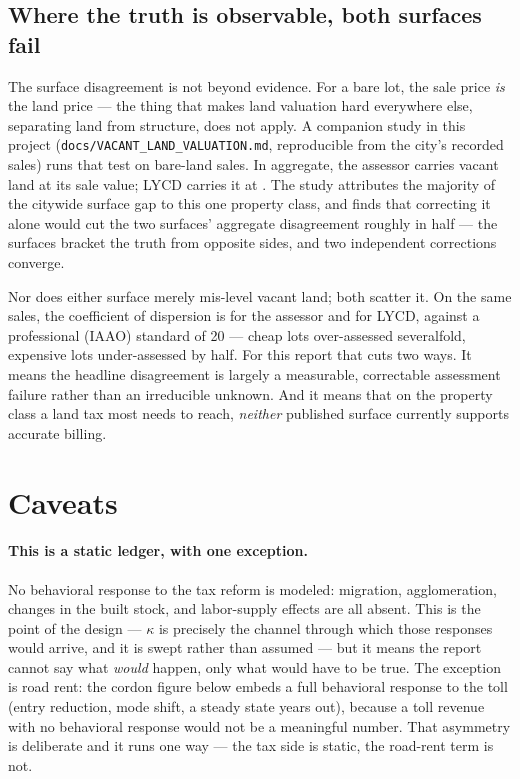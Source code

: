 \documentclass[11pt]{article}
\begin{document}
\subsection{Where the truth is observable, both surfaces fail}

The surface disagreement is not beyond evidence. For a bare lot, the sale price \emph{is} the
land price --- the thing that makes land valuation hard everywhere else, separating land from
structure, does not apply. A companion study in this project
(\texttt{docs/VACANT\_LAND\_VALUATION.md}, reproducible from the city's recorded sales) runs
that test on \StxVacantN{} bare-land sales. In aggregate, the assessor carries vacant land at
\StxVacantOpaAgg{} its sale value; LYCD carries it at \StxVacantLycdAgg{}. The study
attributes the majority of the citywide surface gap to this one property class, and finds that
correcting it alone would cut the two surfaces' aggregate disagreement roughly in half ---
the surfaces bracket the truth from opposite sides, and two independent corrections converge.

Nor does either surface merely mis-level vacant land; both scatter it. On the same sales, the
coefficient of dispersion is \StxVacantOpaCod{} for the assessor and \StxVacantLycdCod{} for
LYCD, against a professional (IAAO) standard of 20 %
--- cheap lots over-assessed severalfold, expensive lots under-assessed by half. For this
report that cuts two ways. It means the headline disagreement is largely a measurable,
correctable assessment failure rather than an irreducible unknown. And it means that on the
property class a land tax most needs to reach, \emph{neither} published surface currently
supports accurate billing.

\section{Caveats}

\paragraph{This is a static ledger, with one exception.} No behavioral response to the tax
reform is modeled: migration, agglomeration, changes in the built stock, and labor-supply
effects are all absent. This is the point of the design --- $\kappa$ is precisely the channel
through which those responses would arrive, and it is swept rather than assumed --- but it
means the report cannot say what \emph{would} happen, only what would have to be true. The
exception is road rent: the cordon figure below embeds a full behavioral response to the toll
(entry reduction, mode shift, a steady state years out), because a toll revenue with no
behavioral response would not be a meaningful number. That asymmetry is deliberate and it runs
one way --- the tax side is static, the road-rent term is not.
\end{document}

